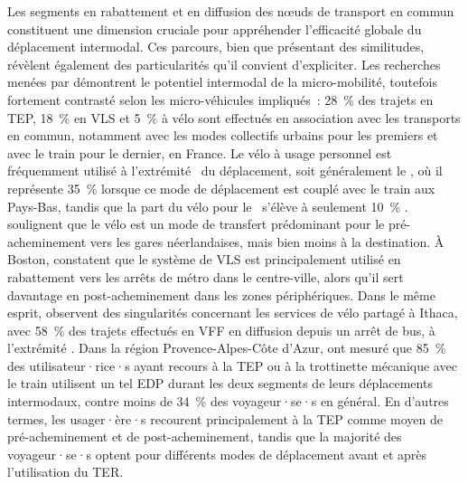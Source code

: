 \begin{refsegment}
Les segments en rabattement et en diffusion des nœuds de transport en commun constituent une dimension cruciale pour appréhender l'efficacité globale du déplacement intermodal. Ces parcours, bien que présentant des similitudes, révèlent également des particularités qu'il convient d'expliciter. Les recherches menées par \textcolor{blue}{\textcite[62]{rabaud_quand_2022}} démontrent le potentiel intermodal de la micro-mobilité, toutefois fortement contrasté selon les \gls{micro-véhicules} impliqués~: 28~\% des trajets en \acrshort{TEP}, 18~\% en \acrshort{VLS} et 5~\% à vélo sont effectués en association avec les transports en commun, notamment avec les modes collectifs urbains pour les premiers et avec le train pour le dernier, en France. Le vélo à usage personnel est fréquemment utilisé à l'extrémité ~du déplacement, soit généralement le , où il représente 35~\% lorsque ce mode de déplacement est couplé avec le train aux Pays-Bas, tandis que la part du vélo pour le ~s'élève à seulement 10~\% \textcolor{blue}{\autocite[74]{rietveld_accessibility_2000}}. \textcolor{blue}{\textcite[359]{givoni_access_2007}} soulignent que le vélo est un mode de transfert prédominant pour le pré-acheminement vers les gares néerlandaises, mais bien moins à la destination. À Boston, \textcolor{blue}{\textcite[3]{romm_differences_2022}} constatent que le système de \acrshort{VLS} est principalement utilisé en rabattement vers les arrêts de métro dans le centre-ville, alors qu'il sert davantage en post-acheminement dans les zones périphériques. Dans le même esprit, \textcolor{blue}{\textcite[7]{qiu_interplay_2021}} observent des singularités concernant les services de vélo partagé à Ithaca, avec 58~\% des trajets effectués en \acrshort{VFF} en diffusion depuis un arrêt de bus, à l'extrémité . Dans la région Provence-Alpes-Côte d'Azur, \textcolor{blue}{\textcite[185]{moinse_intermodal_2022}} ont mesuré que 85~\% des utilisateur·rice·s ayant recours à la \acrshort{TEP} ou à la trottinette mécanique avec le train utilisent un tel \acrfull{EDP} durant les deux segments de leurs déplacements intermodaux, contre moins de 34~\% des voyageur·se·s en général. En d'autres termes, les usager·ère·s recourent principalement à la \acrshort{TEP} comme moyen de pré-acheminement et de post-acheminement, tandis que la majorité des voyageur·se·s optent pour différents modes de déplacement avant et après l'utilisation du \acrshort{TER}.%


\end{refsegment}
